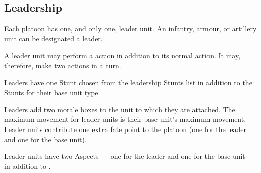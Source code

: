 \subsection{Leadership}
\label{sec:Leadership}

Each platoon has one, and only one, leader unit. An infantry, armour, or artillery unit can be designated a leader.

A leader unit may perform a  action in addition to its normal action. It may, therefore, make two  actions in a turn.

Leaders have one Stunt chosen from the leadership Stunts list in addition to the Stunts for their base unit type.

Leaders add two morale boxes to the unit to which they are attached. The maximum movement for leader units is their base unit's maximum movement. Leader units contribute one extra fate point to the platoon (one for the leader and one for the base unit).

Leader units have two Aspects --- one for the leader and one for the base unit --- in addition to .

